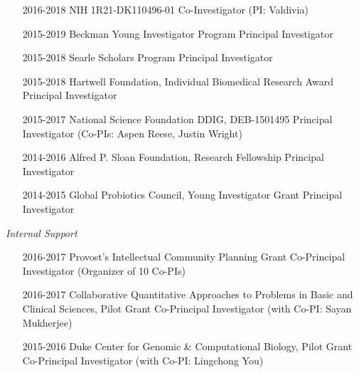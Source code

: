 \documentclass[overlapped,line,11pt]{res}
\begin{document}
\begin{resume}
\begin{itemize}[leftmargin=2cm, style=sameline]
\item[2016-2018] NIH 1R21-DK110496-01 \newline Co-Investigator (PI: Valdivia)

\item[2015-2019] Beckman Young Investigator Program
   \newline Principal Investigator

\item[2015-2018] Searle Scholars Program  \newline Principal Investigator 
  
\item[2015-2018] Hartwell Foundation, Individual Biomedical Research Award \newline Principal Investigator 


\item[2015-2017] National Science Foundation DDIG, DEB-1501495 \newline Principal Investigator (Co-PIs: Aspen Reese, Justin Wright) 


\item[2014-2016] Alfred P. Sloan Foundation, Research Fellowship \newline Principal Investigator 

\item[2014-2015] Global Probiotics Council, Young Investigator Grant  \newline Principal Investigator 

\end{itemize}

\emph{Internal Support}
\vspace{.1in}

\begin{itemize}[leftmargin=2cm, style=sameline]

\item[2016-2017] Provost's Intellectual Community Planning Grant
  \newline Co-Principal Investigator (Organizer of 10
  Co-PIs) 

\item[2016-2017]  Collaborative Quantitative Approaches to Problems in Basic and Clinical Sciences, Pilot Grant
  \newline Co-Principal Investigator (with Co-PI:
  Sayan Mukherjee) 

\item[2015-2016] Duke Center for Genomic \& Computational Biology, Pilot Grant
  \newline Co-Principal Investigator (with Co-PI:
  Lingchong You)


\end{itemize}
\end{resume}
\end{document}
